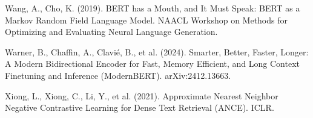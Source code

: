 \item Wang, A., Cho, K. (2019). BERT has a Mouth, and It Must Speak: BERT as a Markov Random Field Language Model. NAACL Workshop on Methods for Optimizing and Evaluating Neural Language Generation.
\item Warner, B., Chaffin, A., Clavié, B., et al. (2024). Smarter, Better, Faster, Longer: A Modern Bidirectional Encoder for Fast, Memory Efficient, and Long Context Finetuning and Inference (ModernBERT). arXiv:2412.13663.
\item Xiong, L., Xiong, C., Li, Y., et al. (2021). Approximate Nearest Neighbor Negative Contrastive Learning for Dense Text Retrieval (ANCE). ICLR.
